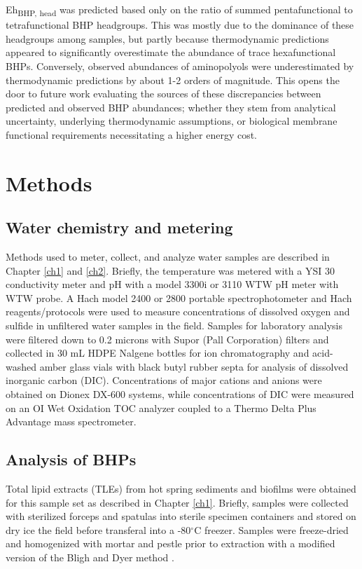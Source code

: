Eh\textsubscript{BHP, head} was predicted based only on the ratio of summed pentafunctional to tetrafunctional BHP headgroups. This was mostly due to the dominance of these headgroups among samples, but partly because thermodynamic predictions appeared to significantly overestimate the abundance of trace hexafunctional BHPs. Conversely, observed abundances of aminopolyols were underestimated by thermodynamic predictions by about 1-2 orders of magnitude. This opens the door to future work evaluating the sources of these discrepancies between predicted and observed BHP abundances; whether they stem from analytical uncertainty, underlying thermodynamic assumptions, or biological membrane functional requirements necessitating a higher energy cost.




\section{Methods}

\subsection{Water chemistry and metering}
Methods used to meter, collect, and analyze water samples are described in Chapter \ref{ch1} and \ref{ch2}. Briefly, the temperature was metered with a YSI 30 conductivity meter and pH with a model 3300i or 3110 WTW pH meter with WTW probe. A Hach model 2400 or 2800 portable spectrophotometer and Hach reagents/protocols were used to measure concentrations of dissolved oxygen and sulfide in unfiltered water samples in the field. Samples for laboratory analysis were filtered down to 0.2 microns with Supor (Pall Corporation) filters and collected in 30 mL HDPE Nalgene bottles for ion chromatography and acid-washed amber glass vials with black butyl rubber septa for analysis of dissolved inorganic carbon (DIC). Concentrations of major cations and anions were obtained on Dionex DX-600 systems, while concentrations of DIC were measured on an OI Wet Oxidation TOC analyzer coupled to a Thermo Delta Plus Advantage mass spectrometer.

\subsection{Analysis of BHPs} Total lipid extracts (TLEs) from hot spring sediments and biofilms were obtained for this sample set as described in Chapter \ref{ch1}. Briefly, samples were collected with sterilized forceps and spatulas into sterile specimen containers and stored on dry ice the field before transferal into a -80$^{\circ}$C freezer. Samples were freeze-dried and homogenized with mortar and pestle prior to extraction with a modified version of the Bligh and Dyer method \citep{white1998signature}.


